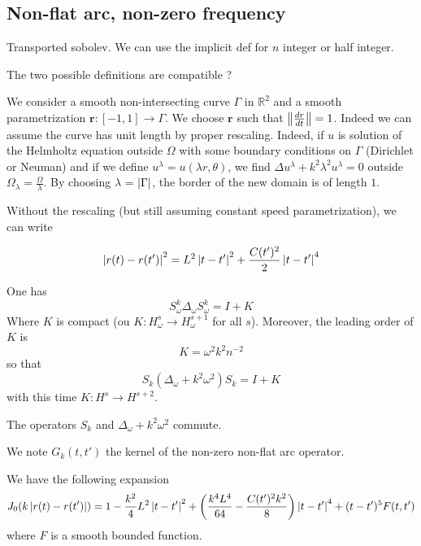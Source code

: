 \documentclass[]{article}
\begin{document}
\subsection{Non-flat arc, non-zero frequency}


\begin{Def}
	Transported sobolev. We can use the implicit def for $n$ integer or half integer. 
\end{Def}

\begin{Prop}
	The two possible definitions are compatible ?
\end{Prop}

We consider a smooth non-intersecting curve $\Gamma$ in $\mathbb{R}^2$ and a smooth parametrization $\textbf{r}: [-1,1] \to \Gamma$. We choose $\textbf{r}$ such that $\left\|\frac{dr}{dt}\right\| = 1$. Indeed we can assume the curve has unit length by proper rescaling. Indeed, if $u$ is solution of the Helmholtz equation outside $\Omega$ with some boundary conditions on $\Gamma$ (Dirichlet or Neuman) and if we define $u^\lambda = u(\lambda r, \theta)$, we find $\Delta u^{\lambda} + k^2 \lambda^2 u^{\lambda} = 0$ outside $\Omega_{\lambda} = \frac{\Omega}{\lambda}$. By choosing $\lambda$ = $\left\lvert \Gamma \right\rvert$, the border of the new domain is of length $1$. 

Without the rescaling (but still assuming constant speed parametrization), we can write 

\[\left\lvert r(t) - r(t') \right\rvert^2 = L^2\left\lvert t-t' \right\rvert^2 + \frac{C(t')^2}{2}\left\lvert t-t' \right\rvert^4\]


\begin{The}
	One has 
	\[S^k_\omega\Delta_\omega S^k_\omega = I + K\]
	Where $K$ is compact (ou $K : H^{s}_{\omega} \to H^{s+1}_{\omega}$ for all $s$). Moreover, the leading order of $K$ is 
	\[K = \omega^2k^2 n^{-2}\]
	so that 
	\[S_k\left(\Delta_\omega + k^2 \omega^2\right)S_k = I + K\]
	with this time $K : H^{s} \to H^{s+2}$.
\end{The}

\begin{The}
	The operators $S_k$ and $\Delta_\omega + k^2 \omega^2$ commute. 
\end{The}

We note $G_k(t,t')$ the kernel of the non-zero non-flat arc operator. 

\begin{Lem}
	We have the following expansion
	\[J_0(k\left\lvert r(t) - r(t') \right\rvert) = 1 - \frac{k^2}{4}L^2\left\lvert t-t' \right\rvert^2 + \left(\frac{k^4L^4}{64} -\frac{C(t')^2k^2}{8}\right)\left\lvert t-t' \right\rvert^4 + (t-t')^5 F(t,t')\]
	where $F$ is a smooth bounded function. 
\end{Lem}
\end{document}
